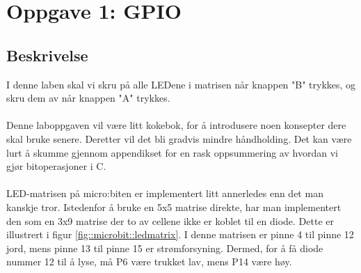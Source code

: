 \documentclass[11pt,a4paper]{article}
\begin{document}
\section{Oppgave 1: GPIO}
\subsection{Beskrivelse}
I denne laben skal vi skru på alle LEDene i matrisen når knappen "B" trykkes, og skru dem av når knappen "A" trykkes.\\
\\
Denne laboppgaven vil være litt kokebok, for å introdusere noen konsepter dere skal bruke senere. Deretter vil det bli gradvis mindre håndholding. Det kan være lurt å skumme gjennom appendikset for en rask oppsummering av hvordan vi gjør bitoperasjoner i C.\\
\\
LED-matrisen på micro:biten er implementert litt annerledes enn det man kanskje tror. Istedenfor å bruke en 5x5 matrise direkte, har man implementert den som en 3x9 matrise der to av cellene ikke er koblet til en diode. Dette er illustrert i figur \ref{fig::microbit::ledmatrix}. I denne matrisen er pinne 4 til pinne 12 jord, mens pinne 13 til pinne 15 er strømforsyning. Dermed, for å få diode nummer 12 til å lyse, må P6 være trukket lav, mens P14 være høy.
\end{document}
